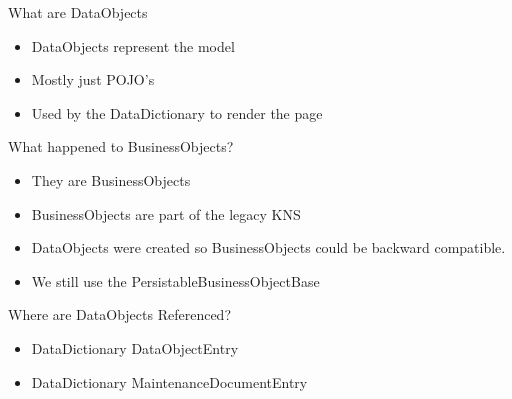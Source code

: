 \documentclass[xcolor=dvipsnames,14pt,professionalfonts]{beamer}
\begin{document}
\begin{frame}{What are DataObjects}
  \begin{itemize}
    \item DataObjects represent the model
    \item Mostly just POJO's
    \item Used by the DataDictionary to render the page
  \end{itemize}
\end{frame}

\begin{frame}{What happened to BusinessObjects?}
  \begin{itemize}
    \item They are BusinessObjects
    \item BusinessObjects are part of the legacy KNS
    \item DataObjects were created so BusinessObjects could be
      backward compatible.
    \item We still use the PersistableBusinessObjectBase
  \end{itemize}
\end{frame}

\begin{frame}{Where are DataObjects Referenced?}
  \begin{itemize}
  \item DataDictionary DataObjectEntry
  \item DataDictionary MaintenanceDocumentEntry
  \end{itemize}
\end{frame}
\end{document}
